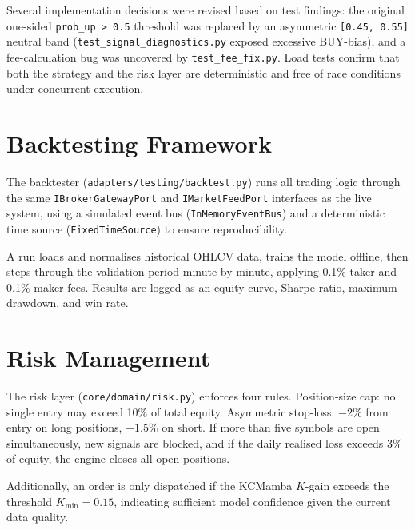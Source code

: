 Several implementation decisions were revised based on test findings:
the original one-sided \texttt{prob\_up > 0.5} threshold was replaced
by an asymmetric \texttt{[0.45, 0.55]} neutral band
(\texttt{test\_signal\_diagnostics.py} exposed excessive BUY-bias),
and a fee-calculation bug was uncovered by \texttt{test\_fee\_fix.py}.
Load tests confirm that both the strategy and the risk layer are
deterministic and free of race conditions under concurrent execution.

\section{Backtesting Framework}
\label{sec:backtest}

The backtester (\texttt{adapters/testing/backtest.py}) runs all trading logic
through the same \texttt{IBrokerGatewayPort} and \texttt{IMarketFeedPort}
interfaces as the live system, using a simulated event bus
(\texttt{InMemoryEventBus}) and a deterministic time source
(\texttt{FixedTimeSource}) to ensure reproducibility.

A run loads and normalises historical OHLCV data, trains the model offline,
then steps through the validation period minute by minute,
applying 0.1\% taker and 0.1\% maker fees. Results are logged as an equity curve, Sharpe
ratio, maximum drawdown, and win rate.


\section{Risk Management}
\label{sec:risk_management}

The risk layer (\texttt{core/domain/risk.py}) enforces four rules.
Position-size cap: no single entry may exceed 10\% of total equity.
Asymmetric stop-loss: $-2\%$ from entry on long positions, $-1.5\%$ on short.
If more than five symbols are open simultaneously, new signals are blocked,
and if the daily realised loss exceeds 3\% of equity, the engine closes all
open positions.

Additionally, an order is only dispatched if the KCMamba $K$-gain exceeds
the threshold $K_\text{min} = 0{.}15$, indicating sufficient model confidence
given the current data quality.


